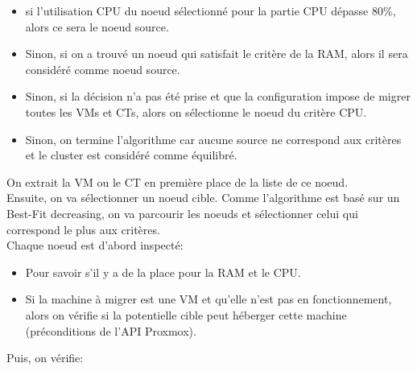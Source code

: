 \documentclass[14pt]{extarticle}
\begin{document}
    \begin{itemize}[nosep,label=\textendash]
        \item si l'utilisation CPU du noeud sélectionné pour la partie CPU dépasse 80\%, alors ce sera le noeud source.
        \item Sinon, si on a trouvé un noeud qui satisfait le critère de la RAM, alors il sera considéré comme noeud source.
        \item Sinon, si la décision n'a pas été prise et que la configuration impose de migrer toutes les VMs et CTs, alors on sélectionne le noeud du critère CPU.
        \item Sinon, on termine l'algorithme car aucune source ne correspond aux critères et le cluster est considéré comme équilibré.
    \end{itemize}
    On extrait la VM ou le CT en première place de la liste de ce noeud.\\
    Ensuite, on va sélectionner un noeud cible. Comme l'algorithme est basé sur un Best-Fit decreasing, on va parcourir les noeuds et sélectionner celui qui correspond le plus aux critères.\\
    Chaque noeud est d'abord inspecté:
    \begin{itemize}[nosep,label=\textendash]
        \item Pour savoir s'il y a de la place pour la RAM et le CPU.
        \item Si la machine à migrer est une VM et qu'elle n'est pas en fonctionnement, alors on vérifie si la potentielle cible peut héberger cette machine (préconditions de l'API Proxmox).
    \end{itemize}
    Puis, on vérifie:
\end{document}
